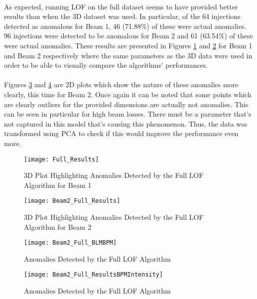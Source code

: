 \paragraph{ }As expected, running \acs{LOF} on the full dataset seems to have provided better results than when the 3D dataset was used. In particular, of the 64 injections detected as anomalous for Beam 1, 46 (71.88\%) of these were actual anomalies.  96 injections were detected to be anomalous for Beam 2 and 61 (63.54\%) of these were actual anomalies. These results are presented in Figures \ref{fig::Full_results1} and \ref{fig::Full_results2} for Beam 1 and Beam 2 respectively where the same parameters as the 3D data were used in order to be able to visually compare the algorithms' performances.

\paragraph{ }Figures \ref{fig::Full_2D1} and \ref{fig::Full_2D2} are 2D plots which show the nature of these anomalies more clearly, this time for Beam 2. Once again it can be noted that some points which are clearly outliers for the provided dimensions are actually not anomalies. This can be seen in particular for high beam losses. There must be a parameter that's not captured in this model that's causing this phenomenon. Thus, the data was transformed using \acs{PCA} to check if this would improve the performance even more.

\begin{figure}[H]
	\centering
	\texttt{[image: Full\_Results]}
	\caption[Full Dataset Results Beam 1]{3D Plot Highlighting Anomalies Detected by the Full LOF Algorithm for Beam 1}
	\label{fig::Full_results1}
\end{figure}

\begin{figure}[H]
	\centering
	\texttt{[image: Beam2\_Full\_Results]}
	\caption[Full Dataset Results Beam 2]{3D Plot Highlighting Anomalies Detected by the Full LOF Algorithm for Beam 2}
	\label{fig::Full_results2}
\end{figure} 

\begin{figure}[H]
	\centering
	\texttt{[image: Beam2\_Full\_BLMBPM]}
	\caption[Full Model BLM/BPM Plot]{Anomalies Detected by the Full LOF Algorithm}
	\label{fig::Full_2D1}
\end{figure}  

\begin{figure}[H]
	\centering
	\texttt{[image: Beam2\_Full\_ResultsBPMIntensity]}
	\caption[Full Model Intensity/BPM Plot]{Anomalies Detected by the Full LOF Algorithm}
	\label{fig::Full_2D2}
\end{figure} 

